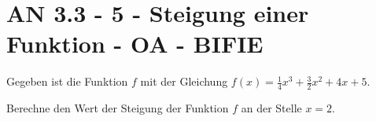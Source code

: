 \section{AN 3.3 - 5 - Steigung einer Funktion - OA - BIFIE}

\begin{beispiel}[AN 3.3]{1} %
				Gegeben ist die Funktion $f$ mit der Gleichung $f(x)=\frac{1}{4}x^3+\frac{3}{2}x^2+4x+5$.

Berechne den Wert der Steigung der Funktion $f$ an der Stelle $x=2$.
\leer

\end{beispiel}